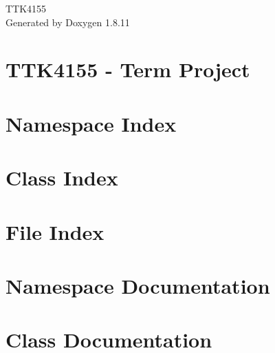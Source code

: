 \documentclass[twoside]{book}
\newcommand{\+}{\discretionary{\mbox{\scriptsize$\hookleftarrow$}}{}{}}
\newcommand{\clearemptydoublepage}{%
  \newpage{\pagestyle{empty}\cleardoublepage}%
}
\begin{document}
\hypersetup{pageanchor=false,
             bookmarksnumbered=true,
             pdfencoding=unicode
            }
\begin{titlepage}
\vspace*{7cm}
\begin{center}%
{\Large T\+T\+K4155 }\\
\vspace*{1cm}
{\large Generated by Doxygen 1.8.11}\\
\end{center}
\end{titlepage}
\clearemptydoublepage
\tableofcontents
\clearemptydoublepage
{}
\hypersetup{pageanchor=true}

\chapter{T\+T\+K4155 -\/ Term Project}
\label{md_Node1_README}
\hypertarget{md_Node1_README}{}

\chapter{Namespace Index}

\chapter{Class Index}

\chapter{File Index}

\chapter{Namespace Documentation}


\chapter{Class Documentation}







\end{document}
